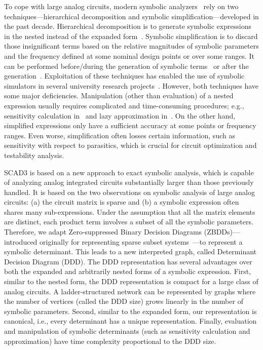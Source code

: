 To cope with large analog circuits,
modern symbolic analyzers~\cite{FeRo96}
rely on two techniques---hierarchical decomposition
and symbolic simplification---developed in the past decade.
Hierarchical decomposition is to generate
symbolic expressions in the nested instead of
the expanded form~\cite{HaLi95,StKo86}.
Symbolic simplification is to discard those insignificant
terms based on the relative magnitudes of 
symbolic parameters and the frequency defined at some
nominal design points or over some ranges.
It can be performed before/during the generation of
symbolic terms~\cite{ChMa92,HsSe94,SeDe92,YuSe96} 
or after the generation~\cite{FeMa92,GiSa91,WaGi96}.
Exploitation of these techniques has enabled the use
of symbolic simulators in several university research 
projects~\cite{CaCa91,FeRo96,GiSa91,YoSa95}.
However, both techniques have some major deficiencies.
Manipulation (other than evaluation) of a nested expression
usually requires complicated and time-consuming
procedures; e.g., 
sensitivity calculation in~\cite{Li92} and
lazy approximation in~\cite{SeDe92}.
On the other hand, simplified expressions only have a sufficient accuracy
at some points or frequency ranges.
Even worse, simplification often losses certain information,
such as sensitivity with respect to parasitics, 
which is crucial for circuit optimization and testability analysis.

SCAD3 is based  on a new approach to
exact symbolic analysis, which is capable of analyzing
analog integrated circuits substantially 
larger than those previously handled.
It is based on the two observations on
symbolic analysis of large analog circuits:
(a) the circuit matrix is sparse
and (b) a symbolic expression often shares many sub-expressions.
Under the assumption that all the matrix elements are distinct,
each product term involves a subset of all the
symbolic parameters. Therefore, we adapt 
Zero-suppressed Binary Decision Diagrams (ZBDDs)---introduced 
originally for representing sparse subset systems~\cite{Mi93}---to 
represent a symbolic determinant.
This leads to a new interpreted graph, 
called Determinant Decision Diagram (DDD).
The DDD representation has several advantages over both the
expanded and arbitrarily nested forms of a symbolic expression.
First, similar to the nested form,
the DDD representation is 
compact for a large class of analog circuits.
A ladder-structured network can be represented
by graphs where the number of vertices (called the DDD size)
grows linearly in the number of symbolic parameters.
Second, similar to the expanded form,
our representation is canonical, i.e.,
every determinant has a unique representation.
Finally, evaluation and manipulation of
symbolic determinants (such as sensitivity calculation and
approximation)
have time complexity proportional to the DDD size.

